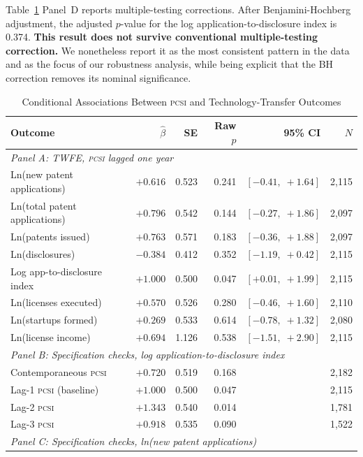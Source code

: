 \documentclass[12pt]{article}
\newcommand{\PCSI}{\textsc{pcsi}}
\begin{document}
Table~\ref{tab:main} Panel~D reports multiple-testing corrections. After
Benjamini-Hochberg adjustment, the adjusted $p$-value for the log application-to-disclosure
index is 0.374. \textbf{This result does not survive conventional multiple-testing
correction.} We nonetheless report it as the most consistent pattern in the data and as
the focus of our robustness analysis, while being explicit that the BH correction
removes its nominal significance.

\begin{table}[htbp]
\centering
\caption{Conditional Associations Between \PCSI{} and Technology-Transfer Outcomes}
\label{tab:main}
\begin{threeparttable}
\begin{tabular}{lrrrrr}
\toprule
Outcome & $\hat\beta$ & SE & Raw $p$ & 95\% CI & $N$ \\
\midrule
\multicolumn{6}{l}{\textit{Panel A: TWFE, \PCSI{} lagged one year}} \\
Ln(new patent applications) & $+0.616$ & 0.523 & 0.241 & $[-0.41,\; +1.64]$ & 2,115 \\
Ln(total patent applications) & $+0.796$ & 0.542 & 0.144 & $[-0.27,\; +1.86]$ & 2,097 \\
Ln(patents issued) & $+0.763$ & 0.571 & 0.183 & $[-0.36,\; +1.88]$ & 2,097 \\
Ln(disclosures) & $-0.384$ & 0.412 & 0.352 & $[-1.19,\; +0.42]$ & 2,115 \\
Log app-to-disclosure index & $+1.000$ & 0.500 & 0.047 & $[+0.01,\; +1.99]$ & 2,115 \\
Ln(licenses executed) & $+0.570$ & 0.526 & 0.280 & $[-0.46,\; +1.60]$ & 2,110 \\
Ln(startups formed) & $+0.269$ & 0.533 & 0.614 & $[-0.78,\; +1.32]$ & 2,080 \\
Ln(license income) & $+0.694$ & 1.126 & 0.538 & $[-1.51,\; +2.90]$ & 2,115 \\
\midrule
\multicolumn{6}{l}{\textit{Panel B: Specification checks, log application-to-disclosure index}} \\
Contemporaneous \PCSI{} & $+0.720$ & 0.519 & 0.168 & & 2,182 \\
Lag-1 \PCSI{} (baseline) & $+1.000$ & 0.500 & 0.047 & & 2,115 \\
Lag-2 \PCSI{} & $+1.343$ & 0.540 & 0.014 & & 1,781 \\
Lag-3 \PCSI{} & $+0.918$ & 0.535 & 0.090 & & 1,522 \\
\midrule
\multicolumn{6}{l}{\textit{Panel C: Specification checks, ln(new patent applications)}} \\

\end{tabular}
\end{threeparttable}
\end{table}
\end{document}
